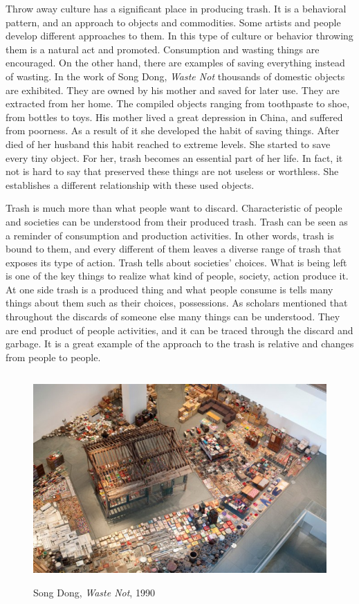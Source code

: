 Throw away culture has a significant place in producing trash. It is a behavioral pattern, and an approach to objects and commodities. Some artists and people develop different approaches to them. In this type of culture or behavior throwing them is a natural act and promoted. Consumption and wasting things are encouraged. On the other hand, there are examples of saving everything instead of wasting. In the work of Song Dong, \textit{Waste Not} thousands of domestic objects are exhibited. They are owned by his mother and saved for later use. They are extracted from her home. The compiled objects ranging from toothpaste to shoe, from bottles to toys. His mother lived a great depression in China, and suffered from poorness. As a result of it she developed the habit of saving things. After died of her husband this habit reached to extreme levels. She started to save every tiny object. For her, trash becomes an essential part of her life. In fact, it not is hard to say that preserved these things are not useless or worthless. She establishes a different relationship with these used objects.

Trash is much more than what people want to discard. Characteristic of people and societies can be understood from their produced trash. Trash can be seen as a reminder of consumption and production activities. In other words, trash is bound to them, and every different of them leaves a diverse range of trash that exposes its type of action. Trash tells about societies’ choices. What is being left is one of the key things to realize what kind of people, society, action produce it. At one side trash is a produced thing and what people consume is tells many things about them such as their choices, possessions. As scholars mentioned that throughout the discards of someone else many things can be understood. They are end product of people activities, and it can be traced through the discard and garbage. It is a great example of the approach to the trash is relative and changes from people to people.

\begin{figure}[h!]
  \centering
  \includegraphics[height=8cm]{graphics/SongDong_WasteNot.jpg}
  \caption{Song Dong, \textit{Waste Not}, 1990}
  \label{fig:SongDong_WasteNot}
\end{figure}

